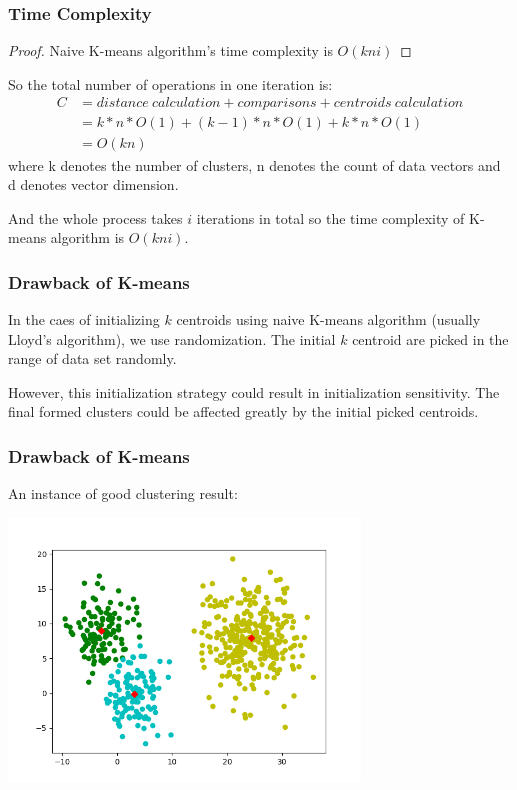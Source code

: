 \documentclass[9pt]{beamer}
\newcommand{\ccb}[1]{{\color{blue}#1}}
\newcommand{\ccp}[1]{{\color{purple}#1}}
\begin{document}
\begin{frame}
	\frametitle{Time Complexity}
	\begin{proof}
		Naive K-means algorithm's time complexity is \ccb{$O(kni)$}
	\end{proof}
	\par So the total number of operations in one iteration is:
	\begin{equation*}
		\begin{split}
			C &=  distance\ calculation + comparisons + centroids\ calculation\\
			& = k * n * O(1) + (k-1) * n * O(1) + k * n * O(1) \\
			& = O(kn)
		\end{split}
	\end{equation*}
	where k denotes the number of clusters, n denotes the count of data vectors and d denotes vector dimension.
	\par And the whole process takes $i$ iterations in total so the time complexity of K-means algorithm is \ccb{$O(kni)$}.
\end{frame}

\begin{frame}
	\frametitle{Drawback of K-means}
	In the caes of initializing $k$ centroids using naive K-means algorithm (usually Lloyd's algorithm), we use \ccp{randomization}.
  The initial $k$ centroid are picked in the range of data set randomly. 
	\par However, this initialization strategy could result in initialization sensitivity. The final formed clusters could be affected greatly by the initial picked centroids.	


\end{frame}

\begin{frame}
	\frametitle{Drawback of K-means}
	An instance of good clustering result:
	\centerline{\includegraphics[width=0.7\textwidth]{figures/fig2.png}}

\end{frame}
\end{document}
